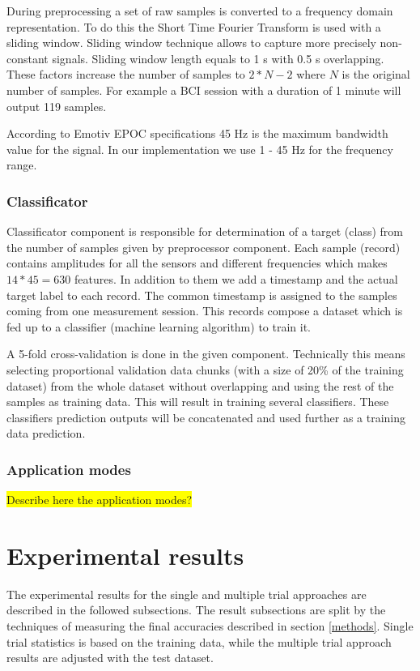 \documentclass[12pt]{article}
\begin{document}
During preprocessing a set of raw samples is converted to a frequency domain representation. To do this the Short Time Fourier Transform is used with a sliding window. Sliding window technique allows to capture more precisely non-constant signals. Sliding window length equals to 1 s with 0.5 s overlapping. These factors increase the number of samples to $2*N-2$ where $N$ is the original number of samples. For example a BCI session with a duration of 1 minute will output 119 samples.

According to Emotiv EPOC specifications\cite{emotiv} 45 Hz is the maximum bandwidth value for the signal. In our implementation we use 1 - 45 Hz for the frequency range.

\subsubsection{Classificator}

Classificator component is responsible for determination of a target (class) from the number of samples given by preprocessor component. Each sample (record) contains amplitudes for all the sensors and different frequencies which makes $14*45=630$ features. In addition to them we add a timestamp and the actual target label to each record. The common timestamp is assigned to the samples coming from one measurement session. This records compose a dataset which is fed up to a classifier (machine learning algorithm) to train it. 

A 5-fold cross-validation is done in the given component. Technically this means selecting proportional validation data chunks (with a size of 20\% of the training dataset) from the whole dataset without overlapping and using the rest of the samples as training data. This will result in training several classifiers. These classifiers prediction outputs will be concatenated and used further as a training data prediction.

\subsubsection{Application modes}
\colorbox{yellow}{Describe here the application modes?}

\newpage
\section{Experimental results}

The experimental results for the single and multiple trial approaches are described in the followed subsections. The result subsections are split by the techniques of measuring the final accuracies described in section \ref{methods}. Single trial statistics is based on the training data, while the multiple trial approach results are adjusted with the test dataset.
\end{document}
